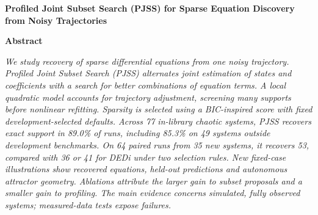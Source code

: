\documentclass[letterpaper,10pt]{article}
\begin{document}
\begin{center}\vspace*{0.13in}
{\large\bfseries Profiled Joint Subset Search (PJSS) for Sparse Equation Discovery\\from Noisy Trajectories\par}
\vspace{0.08in}\end{center}
\begin{center}\textbf{\large Abstract}\end{center}
\noindent\textit{We study recovery of sparse differential equations from one noisy trajectory. Profiled Joint Subset Search (PJSS) alternates joint estimation of states and coefficients with a search for better combinations of equation terms. A local quadratic model accounts for trajectory adjustment, screening many supports before nonlinear refitting. Sparsity is selected using a BIC-inspired score with fixed development-selected defaults. Across 77 in-library chaotic systems, PJSS recovers exact support in 89.0\% of runs, including 85.3\% on 49 systems outside development benchmarks. On 64 paired runs from 35 new systems, it recovers 53, compared with 36 or 41 for DEDi under two selection rules. New fixed-case illustrations show recovered equations, held-out predictions and autonomous attractor geometry. Ablations attribute the larger gain to subset proposals and a smaller gain to profiling. The main evidence concerns simulated, fully observed systems; measured-data tests expose failures.}
\end{document}
